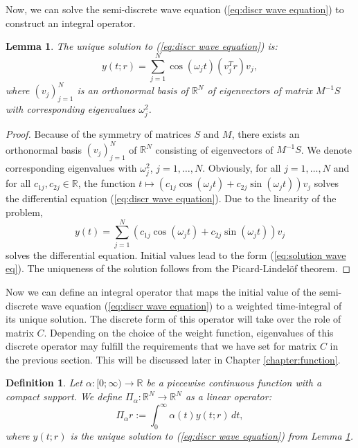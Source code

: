 \documentclass[a4paper,11pt,bibliography=totoc,listof=totoc,headinclude=true,cleardoublepage=empty,oneside]{scrbook}
\newtheorem{definition}[theorem]{Definition}
\newtheorem{lemma}[theorem]{Lemma}
\newcommand{\R}{\mathbb{R}}
\renewcommand{\eqref}[1]{(\ref{#1})}
\begin{document}
Now, we can solve the semi-discrete wave equation \eqref{eq:discr wave equation} to construct an integral operator. 
\begin{lemma}\label{lemma:y solution}
    The unique solution to \eqref{eq:discr wave equation} is:
    \begin{equation}\label{eq:solution wave eq}
        y(t; r) = \sum_{j=1}^N \cos(\omega_j t) (v_j^T r) v_j,
    \end{equation}
    where $(v_j)_{j=1}^N$ is an orthonormal basis of $\R^N$ of eigenvectors of matrix $M^{-1}S$ with corresponding eigenvalues $\omega_j^2$.
\end{lemma}
\begin{proof}
    Because of the symmetry of matrices $S$ and $M$, there exists an orthonormal basis $(v_j)_{j=1}^N$ of $\R^N$ consisting of eigenvectors of $M^{-1}S$. We denote corresponding eigenvalues with $\omega_j^2$, $j=1, \dots, N$. Obviously, for all $j=1, \dots, N$ and for all $c_{1j}, c_{2j}\in \R$, the function $t\mapsto \left(c_{1j} \cos(\omega_j t) + c_{2j} \sin(\omega_j t)\right)v_j$ solves the differential equation \eqref{eq:discr wave equation}. Due to the linearity of the problem, 
    \begin{equation*}
        y(t) = \sum_{j=1}^N \left(c_{1j} \cos(\omega_j t) + c_{2j} \sin(\omega_j t)\right)v_j
    \end{equation*}
    solves the differential equation. Initial values lead to the form \eqref{eq:solution wave eq}. The uniqueness of the solution follows from the Picard-Lindelöf theorem.
\end{proof}

Now we can define an integral operator that maps the initial value of the semi-discrete wave equation \eqref{eq:discr wave equation} to a weighted time-integral of its unique solution. The discrete form of this operator will take over the role of matrix $C$. Depending on the choice of the weight function, eigenvalues of this discrete operator may fulfill the requirements that we have set for matrix $C$ in the previous section. This will be discussed later in Chapter \ref{chapter:function}. 

\begin{definition}\label{def:pi_alpha}
    Let $\alpha: [0; \infty) \rightarrow \R$ be a piecewise continuous function with a compact support. We define $\Pi_\alpha: \R^N \rightarrow \R^N$ as a linear operator:
    \begin{equation*}
        \Pi_\alpha r := \int_0^\infty \alpha(t) y(t;r) \,dt,
    \end{equation*}
    where $y(t;r)$ is the unique solution to \eqref{eq:discr wave equation} from Lemma \ref{lemma:y solution}.
\end{definition}
\end{document}
